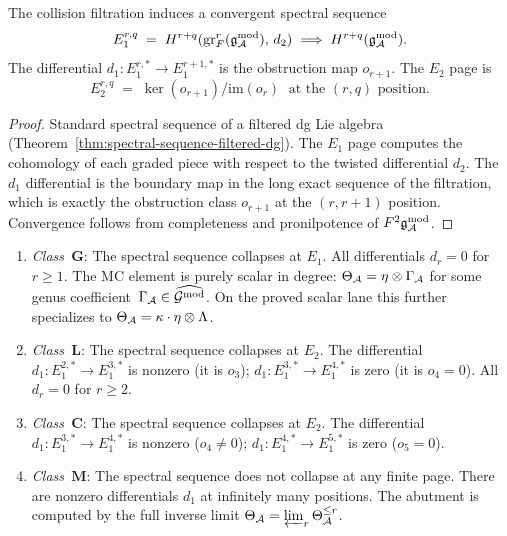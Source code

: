 \begin{theorem}
\label{thm:thqg-holographic-ss}
\ClaimStatusProvedHere
{}
The collision filtration induces a convergent spectral sequence
\begin{equation}\label{eq:thqg-ss}
E_1^{r,q}
\;=\;
H^{r+q}(\operatorname{gr}^r_F(\mathfrak{g}_{\mathcal{A}}^{\mathrm{mod}}),\, d_2)
\;\Longrightarrow\;
H^{r+q}(\mathfrak{g}_{\mathcal{A}}^{\mathrm{mod}}).
\end{equation}
The differential $d_1\colon E_1^{r,*} \to E_1^{r+1,*}$ is
the obstruction map $o_{r+1}$. The $E_2$ page is
\begin{equation}\label{eq:thqg-e2}
E_2^{r,q}
\;=\;
\ker(o_{r+1})/\mathrm{im}(o_r)
\;\text{ at the $(r,q)$ position.}
\end{equation}
\end{theorem}

\begin{proof}
Standard spectral sequence of a filtered dg Lie algebra
(Theorem~\ref{thm:spectral-sequence-filtered-dg}). The
$E_1$ page computes the cohomology of each graded piece
with respect to the twisted differential $d_2$. The
$d_1$ differential is the boundary map in the long exact
sequence of the filtration, which is exactly the
obstruction class $o_{r+1}$ at the $(r, r+1)$ position.
Convergence follows from completeness and pronilpotence of
$F^2\mathfrak{g}_{\mathcal{A}}^{\mathrm{mod}}$.
\end{proof}

\begin{proposition}
\label{prop:thqg-collapse-criteria}
\ClaimStatusProvedHere
{}
\begin{enumerate}[label=\textup{(\roman*)}]
\item \emph{Class~$\mathbf{G}$}: The spectral sequence
 collapses at $E_1$. All differentials $d_r = 0$ for
 $r \geq 1$. The MC element is purely scalar in degree:
 $\Theta_{\mathcal{A}}=\eta\otimes\Gamma_{\mathcal{A}}$ for some genus
 coefficient~$\Gamma_{\mathcal{A}}\in\widehat{\mathcal{G}^{\mathrm{mod}}}$. On the proved
 scalar lane this further specializes to
 $\Theta_{\mathcal{A}} = \kappa\cdot\eta\otimes\Lambda$.
\item \emph{Class~$\mathbf{L}$}: The spectral sequence
 collapses at $E_2$. The differential $d_1\colon
 E_1^{2,*} \to E_1^{3,*}$ is nonzero (it is $o_3$);
 $d_1\colon E_1^{3,*} \to E_1^{4,*}$ is zero (it is $o_4 = 0$).
 All $d_r = 0$ for $r \geq 2$.
\item \emph{Class~$\mathbf{C}$}: The spectral sequence
 collapses at $E_2$. The differential $d_1\colon
 E_1^{3,*} \to E_1^{4,*}$ is nonzero ($o_4 \neq 0$);
 $d_1\colon E_1^{4,*} \to E_1^{5,*}$ is zero ($o_5 = 0$).
\item \emph{Class~$\mathbf{M}$}: The spectral sequence does
 not collapse at any finite page. There are nonzero
 differentials $d_1$ at infinitely many positions. The
 abutment is computed by the full inverse limit
 $\Theta_{\mathcal{A}} = \varprojlim_r \Theta_{\mathcal{A}}^{\leq r}$.
\end{enumerate}
\end{proposition}

